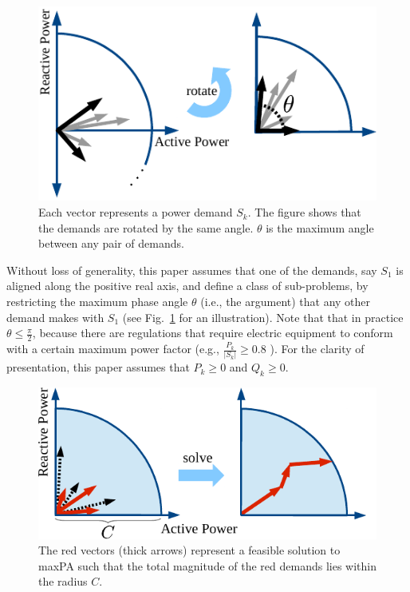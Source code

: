 \begin{figure}[!ht]
	\begin{center} \vspace{-5pt}
		\includegraphics[scale=.8]{fig/rotate.pdf}
	\end{center} \vspace{-5pt}
\caption{Each vector represents a power demand $S_k$. The figure shows that the demands are rotated by the same angle. $\theta$ is the maximum angle between any pair of demands. }
	\label{fig:rotate}
\end{figure} 



Without loss of generality, this paper assumes that one of the demands, say $S_1$ is aligned along the positive real axis, and define a class of sub-problems, by restricting the maximum phase angle $\theta$ (i.e., the argument) that any other demand makes with $S_1$ (see Fig.~\ref{fig:rotate} for an illustration). Note that that in practice $\theta \le \frac{\pi}{2}$, because there are regulations that require electric equipment to conform with a certain maximum power factor (e.g., $\frac{P_k}{|S_k|}\ge 0.8$ \cite{NEC}). For the clarity of presentation, this paper assumes that $P_k \ge 0$ and $Q_k \ge 0$.


\begin{figure}[!htb]
	\centering \vspace{-5pt}
	\includegraphics[scale=.7]{fig/fig-sol-horizontal.pdf} \vspace{-5pt}
\caption{The red vectors (thick arrows) represent a feasible solution to {\sc maxPA} such that the total magnitude of the red demands lies within the radius $C$.} \vspace{-5pt}
	\label{fig:problem}
 \end{figure}
 
